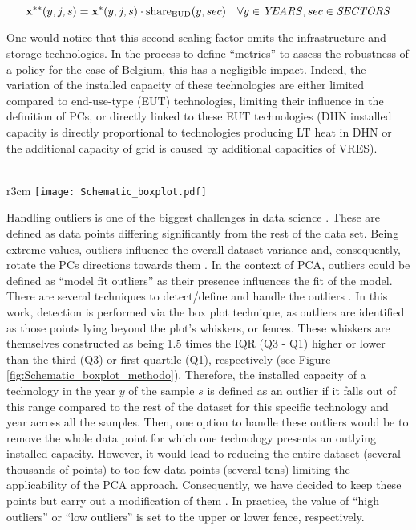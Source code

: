 \begin{equation}
 \label{eq:PCA_scaling_1}
\textbf{x}^{**}(y,j,s)=\textbf{x}^{*}(y,j,s)\cdot \text{share}_{\text{EUD}}(y,sec)
 \quad \forall y \in \text{\emph{YEARS}}, sec \in \text{\emph{SECTORS}}
\end{equation}

One would notice that this second scaling factor omits the infrastructure and storage technologies. In the process to define ``metrics'' to assess the robustness of a policy for the case of Belgium, this has a negligible impact. Indeed, the variation of the installed capacity of these technologies are either limited compared to end-use-type (EUT) technologies, \ie limiting their influence in the definition of PCs, or directly linked to these EUT technologies (\eg \gls{DHN} installed capacity is directly proportional to technologies producing \gls{LT} heat in \gls{DHN} or the additional capacity of grid is caused by additional capacities of \gls{VRES}). \\

\\

\begin{wrapfigure}{r}{3cm}
\centering
\captionsetup{justification=centering}
\texttt{[image: Schematic\_boxplot.pdf]}
\caption{}
\label{fig:Schematic_boxplot_methodo}
\end{wrapfigure}

\noindent
Handling outliers is one of the biggest challenges in data science \cite{aguinis2013best}. These are defined as data points differing significantly from the rest of the data set. Being extreme values, outliers influence the overall dataset variance and, consequently, rotate the PCs directions towards them \cite{stanimirova2007dealing}. In the context of \gls{PCA}, outliers could be defined as ``model fit outliers'' as their presence influences the fit of the model. There are several techniques to detect/define and handle the outliers \cite{aguinis2013best}. In this work, detection is performed via the box plot technique, as outliers are identified as those points lying beyond the plot’s whiskers, or fences. These whiskers are themselves constructed as being 1.5 times the \gls{IQR} (Q3 - Q1) higher or lower than the third (Q3) or first quartile (Q1), respectively (see Figure \ref{fig:Schematic_boxplot_methodo}). Therefore, the installed capacity of a technology in the year $y$ of the sample $s$ is defined as an outlier if it falls out of this range compared to the rest of the dataset for this specific technology and year across all the samples. Then, one option to handle these outliers would be to remove the whole data point for which one technology presents an outlying installed capacity. However, it would lead to reducing the entire dataset (\ie several thousands of points) to too few data points (\ie several tens) limiting the applicability of the \gls{PCA} approach. Consequently, we have decided to keep these points but carry out a modification of them \cite{aguinis2013best}. In practice,  the value of ``high outliers'' or ``low outliers'' is set to the upper or lower fence, respectively.\\

